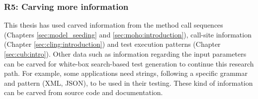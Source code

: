 \subsubsection{R5: Carving more information}
This thesis has used carved information from the method call sequences (\eg Chapters \ref{sec:model_seeding} and \ref{sec:moho:introduction}), call-site information (Chapter \ref{sec:cling:introduction}) and test execution patterns (Chapter \ref{sec:cub:intro}). Other data such as information regarding the input parameters can be carved for white-box search-based test generation to continue this research path. For example, some applications need strings, following a specific grammar and pattern (\eg XML, JSON), to be used in their testing. These kind of information can be carved from source code and documentation.